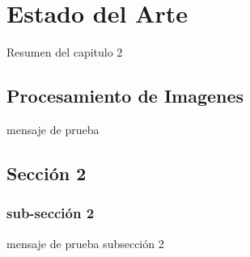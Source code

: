 \chapter{Estado del Arte}
\label{capitulo2}

Resumen del capitulo 2

\section{Procesamiento de Imagenes}
mensaje de prueba

\section{Sección 2}
\subsection{sub-sección 2}
mensaje de prueba subsección 2

